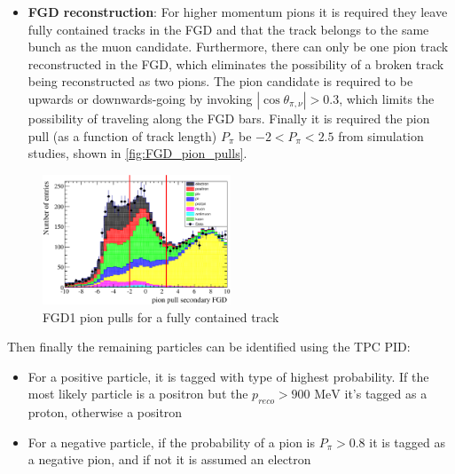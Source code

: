 \begin{itemize}
\begin{itemize}
		\item \textbf{FGD reconstruction}: For higher momentum pions it is required they leave fully contained tracks in the FGD and that the track belongs to the same bunch as the muon candidate. Furthermore, there can only be one pion track reconstructed in the FGD, which eliminates the possibility of a broken track being reconstructed as two pions. The pion candidate is required to be upwards or downwards-going by invoking $|\cos\theta_{\pi,\nu}| > 0.3$, which limits the possibility of traveling along the FGD bars. Finally it is required the pion pull (as a function of track length) $P_\pi$ be $-2 < P_\pi < 2.5$ from simulation studies, shown in \autoref{fig:FGD_pion_pulls}.
	\end{itemize}
\end{itemize}
\begin{figure}[h]
	\includegraphics[width=0.5\textwidth]{figures/numu/Cuts/pull_secondarytrack_FGD_all.eps}
	\caption{FGD1 pion pulls for a fully contained track}
	\label{fig:FGD_pion_pulls}
\end{figure}

Then finally the remaining particles can be identified using the TPC PID: 
\begin{itemize}
	\item For a positive particle, it is tagged with type of highest probability. If the most likely particle is a positron but the $p_{reco} > 900\text{ MeV}$ it's tagged as a proton, otherwise a positron
	
	\item For a negative particle, if the probability of a pion is $P_\pi>0.8$ it is tagged as a negative pion, and if not it is assumed an electron
\end{itemize}

